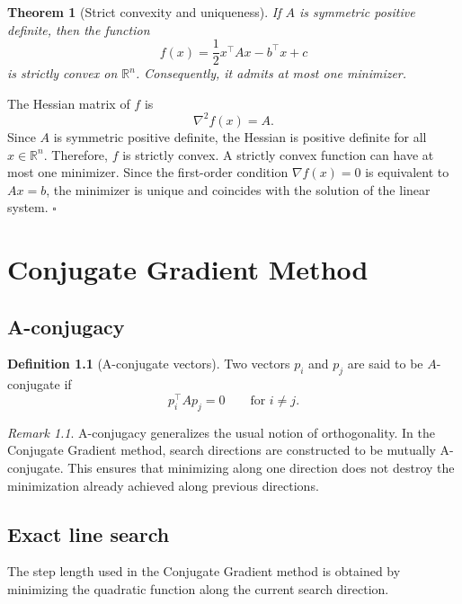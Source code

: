 \documentclass[11pt,a4paper]{report}
\theoremstyle{definition}
\newtheorem{definition}{Definition}[chapter]
\theoremstyle{plain}
\newtheorem{theorem}{Theorem}[chapter]
\theoremstyle{remark}
\newtheorem{remark}{Remark}[chapter]
\renewenvironment{proof}[1][Proof]{%
  \begin{tcolorbox}[enhanced, breakable, colback=white, colframe=black!25, boxrule=0.5pt, arc=1.5mm, borderline west={2pt}{0pt}{black!45}, title=\textbf{#1}, coltitle=bleufonce, fonttitle=\bfseries]
}{%
  \hfill$\square$\end{tcolorbox}
}
\begin{document}
\begin{theorem}[Strict convexity and uniqueness]
If $A$ is symmetric positive definite, then the function
\[
f(x)=\frac12 x^\top A x-b^\top x+c
\]
is strictly convex on $\mathbb{R}^n$. Consequently, it admits at most one minimizer.
\end{theorem}

\begin{proof}
The Hessian matrix of $f$ is
\[
\nabla^2 f(x)=A.
\]
Since $A$ is symmetric positive definite, the Hessian is positive definite for all $x\in\mathbb{R}^n$. Therefore, $f$ is strictly convex. A strictly convex function can have at most one minimizer. Since the first-order condition $\nabla f(x)=0$ is equivalent to $Ax=b$, the minimizer is unique and coincides with the solution of the linear system.
\end{proof}


\chapter{Conjugate Gradient Method}

\section{A-conjugacy}

\begin{definition}[A-conjugate vectors]
Two vectors $p_i$ and $p_j$ are said to be $A$-conjugate if
\[
p_i^\top A p_j=0
\qquad\text{for } i\neq j.
\]
\end{definition}

\begin{remark}
A-conjugacy generalizes the usual notion of orthogonality. In the Conjugate Gradient method, search directions are constructed to be mutually A-conjugate. This ensures that minimizing along one direction does not destroy the minimization already achieved along previous directions.
\end{remark}



\section{Exact line search}

The step length used in the Conjugate Gradient method is obtained by minimizing the quadratic function along the current search direction.
\end{document}
